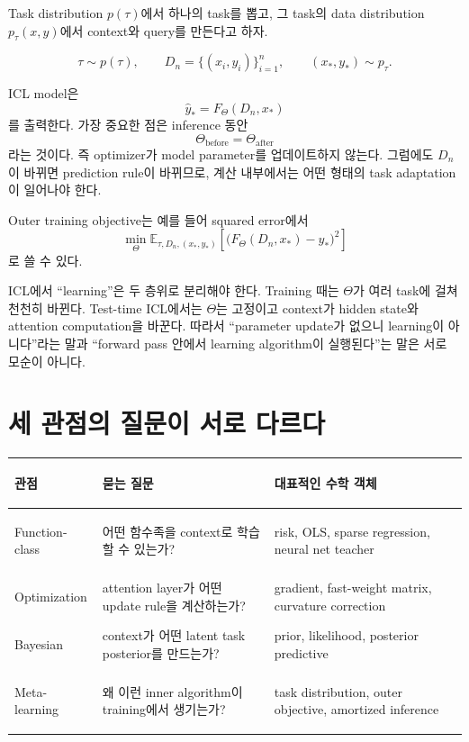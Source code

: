 \documentclass[11pt,a4paper,oneside,openany]{memoir}
\newcommand{\E}{\mathbb{E}}
\theoremstyle{definition}
\begin{document}
Task distribution $p(\tau)$에서 하나의 task를 뽑고,
그 task의 data distribution $p_\tau(x,y)$에서 context와 query를 만든다고 하자.

\[
\tau\sim p(\tau),
\qquad
D_n=\{(x_i,y_i)\}_{i=1}^{n},
\qquad
(x_*,y_*)\sim p_\tau.
\]

ICL model은
\[
\hat y_*=F_\Theta(D_n,x_*)
\]
를 출력한다. 가장 중요한 점은 inference 동안
\[
\boxed{\Theta_{\mathrm{before}}=\Theta_{\mathrm{after}}}
\]
라는 것이다. 즉 optimizer가 model parameter를 업데이트하지 않는다.
그럼에도 $D_n$이 바뀌면 prediction rule이 바뀌므로, 계산 내부에서는 어떤 형태의 task adaptation이 일어나야 한다.

Outer training objective는 예를 들어 squared error에서
\[
\min_\Theta
\E_{\tau,D_n,(x_*,y_*)}
\left[
\bigl(F_\Theta(D_n,x_*)-y_*\bigr)^2
\right]
\]
로 쓸 수 있다.

\begin{keybox}
ICL에서 ``learning''은 두 층위로 분리해야 한다. Training 때는 $\Theta$가 여러 task에 걸쳐 천천히 바뀐다. Test-time ICL에서는 $\Theta$는 고정이고 context가 hidden state와 attention computation을 바꾼다. 따라서 ``parameter update가 없으니 learning이 아니다''라는 말과 ``forward pass 안에서 learning algorithm이 실행된다''는 말은 서로 모순이 아니다.
\end{keybox}

\section{세 관점의 질문이 서로 다르다}

\begin{center}
\small
\begin{tabularx}{\textwidth}{>{\bfseries\raggedright\arraybackslash}p{}Y Y}
\toprule
관점 & 묻는 질문 & 대표적인 수학 객체 \\
\midrule
Function-class & 어떤 함수족을 context로 학습할 수 있는가? & risk, OLS, sparse regression, neural net teacher \\
Optimization & attention layer가 어떤 update rule을 계산하는가? & gradient, fast-weight matrix, curvature correction \\
Bayesian & context가 어떤 latent task posterior를 만드는가? & prior, likelihood, posterior predictive \\
Meta-learning & 왜 이런 inner algorithm이 training에서 생기는가? & task distribution, outer objective, amortized inference \\
\bottomrule
\end{tabularx}
\end{center}
\end{document}
